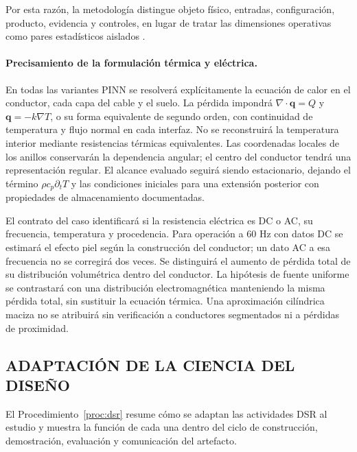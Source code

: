 Por esta razón, la metodología distingue objeto físico, entradas, configuración, producto, evidencia y controles, en lugar de tratar las dimensiones operativas como pares estadísticos aislados \parencites[55--56]{peffers2007}[342--344]{gregor2013}.

\paragraph{Precisamiento de la formulación térmica y eléctrica.}
En todas las variantes PINN se resolverá explícitamente la ecuación de calor
en el conductor, cada capa del cable y el suelo. La pérdida impondrá
$\nabla\!\cdot\mathbf q=Q$ y $\mathbf q=-k\nabla T$, o su forma equivalente
de segundo orden, con continuidad de temperatura y flujo normal en cada
interfaz. No se reconstruirá la temperatura interior mediante resistencias
térmicas equivalentes. Las coordenadas locales de los anillos conservarán
la dependencia angular; el centro del conductor tendrá una representación
regular. El alcance evaluado seguirá siendo estacionario, dejando el término
$\rho c_p\partial_t T$ y las condiciones iniciales para una extensión posterior
con propiedades de almacenamiento documentadas.

El contrato del caso identificará si la resistencia eléctrica es DC o AC,
su frecuencia, temperatura y procedencia. Para operación a 60 Hz con datos
DC se estimará el efecto piel según la construcción del conductor; un dato
AC a esa frecuencia no se corregirá dos veces. Se distinguirá el aumento
de pérdida total de su distribución volumétrica dentro del conductor.
La hipótesis de fuente uniforme se contrastará con una distribución
electromagnética manteniendo la misma pérdida total, sin sustituir la
ecuación térmica. Una aproximación cilíndrica maciza no se atribuirá sin
verificación a conductores segmentados ni a pérdidas de proximidad.

\subsection{ADAPTACIÓN DE LA CIENCIA DEL DISEÑO}

El Procedimiento~\ref{proc:dsr} resume cómo se adaptan las actividades DSR al estudio y muestra la función de cada una dentro del ciclo de construcción, demostración, evaluación y comunicación del artefacto.


